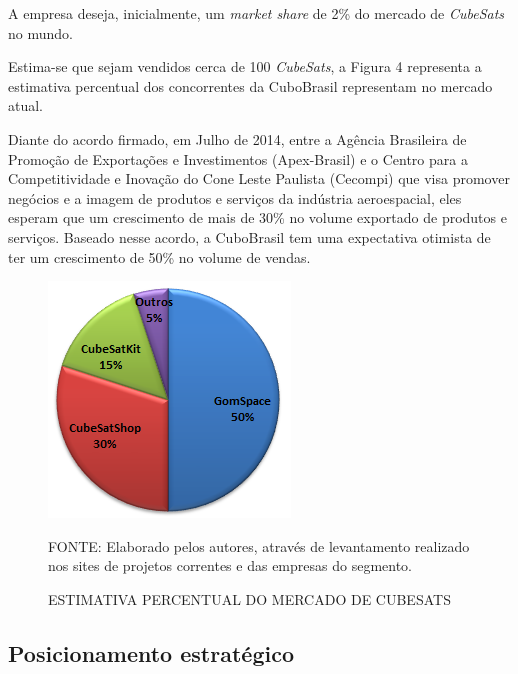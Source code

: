 \documentclass[
	12pt,				%
	openright,			%
	oneside,			%
	a4paper,			%
	english,			%
	french,				%
	spanish,			%
	brazil				%
	]{abntex2}
\begin{document}
	A empresa deseja, inicialmente, um \textit{market share} de 2\% do mercado de \textit{CubeSats} no mundo.
	 
 	Estima-se que sejam vendidos cerca de 100 \textit{CubeSats}, a Figura 4 representa a estimativa percentual dos concorrentes da CuboBrasil representam no mercado atual. 
 	
 	Diante do acordo firmado, em Julho de 2014, entre a Agência Brasileira de Promoção de Exportações e Investimentos (Apex-Brasil) e o Centro para a Competitividade e Inovação do Cone Leste Paulista (Cecompi) que visa promover negócios e a imagem de produtos e serviços da indústria aeroespacial, eles esperam que um crescimento de mais de 30\% no volume exportado de produtos e serviços. Baseado nesse acordo, a CuboBrasil tem uma expectativa otimista de ter um crescimento de 50\% no volume de vendas.

	\begin{figure}[th]
		\caption{ESTIMATIVA PERCENTUAL DO MERCADO DE CUBESATS}
		\centering
		\includegraphics[width=0.5\linewidth]{./figs/Figura_04}
		
		\begin{small}
			FONTE: Elaborado pelos autores, através de levantamento realizado nos sites de projetos correntes e das empresas do segmento.
		\end{small}
	\end{figure}
	
\subsection[Posicionamento estratégico]{Posicionamento estratégico}
\end{document}
